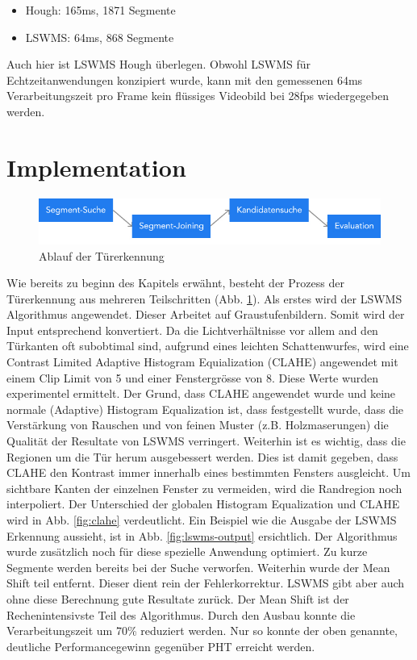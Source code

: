 \begin{itemize}
	\item Hough: 165ms, 1871 Segmente
	\item LSWMS: 64ms, 868 Segmente
\end{itemize}
\noindent
Auch hier ist LSWMS Hough überlegen. Obwohl LSWMS für Echtzeitanwendungen konzipiert wurde, kann mit den gemessenen 64ms Verarbeitungszeit pro Frame kein flüssiges Videobild bei 28fps wiedergegeben werden.

\section{Implementation}

\begin{figure}[!ht]
\centering
\includegraphics[width=\textwidth]{images/door-detection} 
\caption{Ablauf der Türerkennung}
\label{fig:door-detection}
\end{figure}
\noindent
Wie bereits zu beginn des Kapitels erwähnt, besteht der Prozess der Türerkennung aus mehreren Teilschritten (Abb. \ref{fig:door-detection}). Als erstes wird der LSWMS Algorithmus angewendet. Dieser Arbeitet auf Graustufenbildern. Somit wird der Input entsprechend konvertiert. Da die Lichtverhältnisse vor allem and den Türkanten oft subobtimal sind, aufgrund eines leichten Schattenwurfes, wird eine Contrast Limited Adaptive Histogram Equialization (CLAHE) angewendet mit einem Clip Limit von 5 und einer Fenstergrösse von 8. Diese Werte wurden experimentel ermittelt. Der Grund, dass CLAHE angewendet wurde und keine normale (Adaptive) Histogram Equalization ist, dass festgestellt wurde, dass die Verstärkung von Rauschen und von feinen Muster (z.B. Holzmaserungen) die Qualität der Resultate von LSWMS verringert. Weiterhin ist es wichtig, dass die Regionen um die Tür herum ausgebessert werden. Dies ist damit gegeben, dass CLAHE den Kontrast immer innerhalb eines bestimmten Fensters ausgleicht. Um sichtbare Kanten der einzelnen Fenster zu vermeiden, wird die Randregion noch interpoliert. Der Unterschied der globalen Histogram Equalization und CLAHE wird in Abb. \ref{fig:clahe} verdeutlicht. Ein Beispiel wie die Ausgabe der LSWMS Erkennung aussieht, ist in Abb. \ref{fig:lswms-output} ersichtlich. Der Algorithmus wurde zusätzlich noch für diese spezielle Anwendung optimiert. Zu kurze Segmente werden bereits bei der Suche verworfen. Weiterhin wurde der Mean Shift teil entfernt. Dieser dient rein der Fehlerkorrektur. LSWMS gibt aber auch ohne diese Berechnung gute Resultate zurück. Der Mean Shift ist der Rechenintensivste Teil des Algorithmus. Durch den Ausbau konnte die Verarbeitungszeit um 70\% reduziert werden. Nur so konnte der oben genannte, deutliche Performancegewinn gegenüber PHT erreicht werden.


